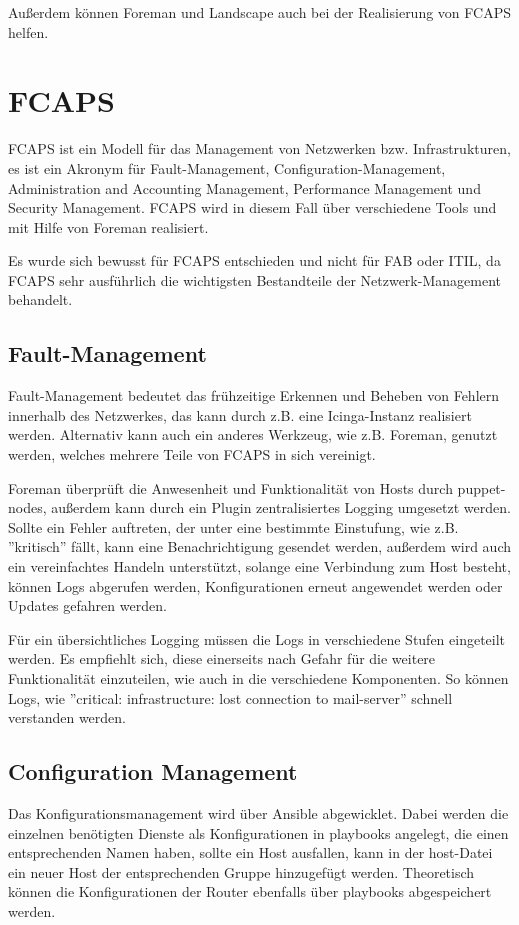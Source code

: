 Außerdem können Foreman und Landscape auch bei der Realisierung von FCAPS helfen.

\section{FCAPS}
FCAPS ist ein Modell für das Management von Netzwerken bzw. Infrastrukturen, es ist ein Akronym für Fault-Management, Configuration-Management, Administration and Accounting Management, Performance Management und Security Management. FCAPS wird in diesem Fall über verschiedene Tools und mit Hilfe von Foreman realisiert.

Es wurde sich bewusst für FCAPS entschieden und nicht für FAB oder ITIL, da FCAPS sehr ausführlich die wichtigsten Bestandteile der Netzwerk-Management behandelt.


\subsection{Fault-Management}
Fault-Management bedeutet das frühzeitige Erkennen und Beheben von Fehlern innerhalb des Netzwerkes, das kann durch z.B. eine Icinga-Instanz realisiert werden. Alternativ kann auch ein anderes Werkzeug, wie z.B. Foreman, genutzt werden, welches mehrere Teile von FCAPS in sich vereinigt.

Foreman überprüft die Anwesenheit und Funktionalität von Hosts durch puppet-nodes, außerdem kann durch ein Plugin zentralisiertes Logging umgesetzt werden. Sollte ein Fehler auftreten, der unter eine bestimmte Einstufung, wie z.B. ''kritisch'' fällt, kann eine Benachrichtigung gesendet werden, außerdem wird auch ein vereinfachtes Handeln unterstützt, solange eine Verbindung zum Host besteht, können Logs abgerufen werden, Konfigurationen erneut angewendet werden oder Updates gefahren werden.

Für ein übersichtliches Logging müssen die Logs in verschiedene Stufen eingeteilt werden. Es empfiehlt sich, diese einerseits nach Gefahr für die weitere Funktionalität einzuteilen, wie auch in die verschiedene Komponenten. So können Logs, wie ''critical: infrastructure: lost connection to mail-server'' schnell verstanden werden.

\subsection{Configuration Management}
Das Konfigurationsmanagement wird über Ansible abgewicklet. Dabei werden die einzelnen benötigten Dienste als Konfigurationen in playbooks angelegt, die einen entsprechenden Namen haben, sollte ein Host ausfallen, kann in der host-Datei ein neuer Host der entsprechenden Gruppe hinzugefügt werden. Theoretisch können die Konfigurationen der Router ebenfalls über playbooks abgespeichert werden. 

